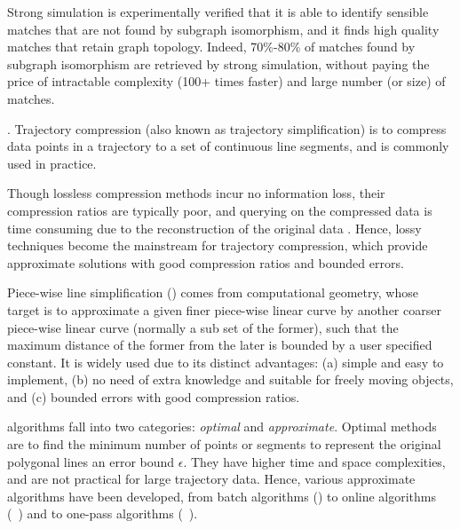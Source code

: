 Strong simulation is experimentally verified that it is able to identify sensible matches that are not found by subgraph isomorphism, and it finds high
quality matches that retain graph topology. Indeed, 70\%-80\% of matches found by subgraph
isomorphism are retrieved by strong simulation, without paying the price of intractable complexity (100+ times faster) and large number (or
size) of matches.



.  Trajectory compression (also known as trajectory simplification) is to compress data points in a trajectory to a set of continuous line segments, and is commonly used  in practice.

Though lossless compression methods incur no information loss, their compression ratios are typically poor, and querying on the compressed data is time consuming due to the reconstruction of the original data \cite{Nibali:Trajic}. Hence, lossy techniques become the mainstream for trajectory compression,
which provide approximate solutions with good compression ratios and bounded errors.


Piece-wise line simplification (\lsa) comes from computational geometry, whose target is to approximate a given finer piece-wise linear curve by another coarser piece-wise linear curve ({normally} a sub set of the former), such that the maximum distance of the former from the later is bounded by a user specified constant. It is widely used due to its distinct advantages: (a) simple and easy to implement, (b) no need of extra knowledge and suitable for freely  moving  objects, and (c) bounded errors with good compression ratios. 

\lsa algorithms fall into two categories: {\em optimal} and {\em approximate}.
Optimal methods\cite{Imai:Optimal} are to find the minimum number of points or segments to represent the original polygonal lines \wrt an error bound $\epsilon$. They have higher time and space complexities, and are not practical for large trajectory data.
Hence,  various approximate \lsa algorithms have been developed, from batch algorithms (\eg \cite{Douglas:Peucker}) to online algorithms (\eg~\cite{Liu:BQS}) and to one-pass algorithms (\eg~\cite{LinMZWH17}).


